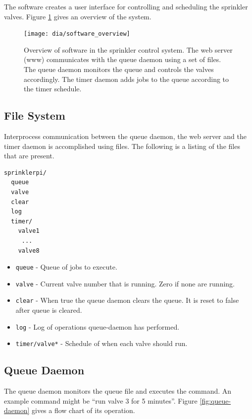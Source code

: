 \documentclass{article}
\begin{document}
The software creates a user interface for controlling
and scheduling the sprinkler valves.
Figure \ref{fig:swoview} gives an overview of the system.

\begin{figure}[htbp!]
\begin{center}
\texttt{[image: dia/software\_overview]}
\end{center}
\caption{Overview of software in the sprinkler control system.
The web server (www) communicates with the queue daemon
using a set of files.
The queue daemon monitors the queue and controls the valves accordingly.
The timer daemon adds jobs to the queue according to the timer schedule.}
\label{fig:swoview}
\end{figure}

\FloatBarrier
\subsection{File System}

Interprocess communication between the queue daemon, the web server
and the timer daemon is accomplished using files.
The following is a listing of the files that are present.

\begin{verbatim}
sprinklerpi/
  queue
  valve
  clear
  log
  timer/
    valve1
     ...
    valve8
\end{verbatim}

\begin{itemize}
    \item \verb+queue+ - Queue of jobs to execute.
    \item \verb+valve+ - Current valve number that is running.
        Zero if none are running.
    \item \verb+clear+ - When true the queue daemon clears the queue.
        It is reset to false after queue is cleared.
    \item \verb+log+ - Log of operations queue-daemon has performed.
    \item \verb+timer/valve*+ - Schedule of when each valve should run.
\end{itemize}

\FloatBarrier
\subsection{Queue Daemon}

The queue daemon monitors the queue file and executes the command.
An example command might be ``run valve 3 for 5 minutes''.
Figure \ref{fig:queue-daemon} gives a flow chart of its operation.
\end{document}
